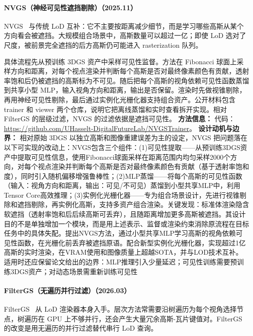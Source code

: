 \paragraph{NVGS（神经可见性遮挡剔除）（2025.11）}
NVGS~\cite{2511_19202} 与传统 LoD 互补：它不主要按距离减少细节，而是学习哪些高斯从某个方向看会被遮挡。大规模组合场景中，高斯数量可以超过一亿；即使 LoD 选对了尺度，被前景完全遮挡的后方高斯仍可能进入 rasterization 队列。

具体流程先从预训练 3DGS 资产中采样可见性监督。方法在 Fibonacci 球面上采样方向和距离，对每个视点渲染并判断每个高斯是否对最终像素颜色有贡献，透射率饱和后仍被遮挡的高斯标为不可见。随后把每个高斯的视角依赖可见性函数蒸馏到共享小型 MLP，输入视角方向和距离，输出是否保留。渲染时先做视锥剔除，再用神经可见性剔除，最后通过实例化光栅化器支持组合资产。公开材料包含 trainer 和 viewer 两个仓库，说明它把离线蒸馏和实时查看拆开实现。相对 FilterGS 的层级过滤，NVGS 的过滤依据是遮挡可见性。
\textbf{方法信息：} 代码：\url{https://github.com/UHasselt-DigitalFutureLab/NVGSTrainer}。
\textbf{设计动机与边界：} 相对原始 3DGS 以独立高斯和图像重建误差为主的设定，NVGS 把问题落在以下可实现的改动上：NVGS包含三个组件：(1)可见性提取——从预训练3DGS资产中提取可见性信息，使用Fibonacci球面采样在距离范围内均匀采样2000个方向，对每个视点渲染并判断每个高斯是否对最终像素颜色有贡献（基于透射率饱和度），同时引入随机偏移增强鲁棒性；(2)MLP蒸馏——将每个高斯的可见性函数（输入：视角方向和距离，输出：可见/不可见）蒸馏到小型共享MLP中，利用Tensor Core高效推理；(3)实例化光栅化器——专为组合场景设计，先进行视锥剔除和遮挡剔除，再实例化高斯，支持多资产组合渲染。关键发现：标准体渲染隐含软遮挡（透射率饱和后后续高斯可丢弃），且随距离增加更多高斯被遮挡。其设计目的不是单独增加一个模块，而是用上述表示、监督或渲染约束消除原流程在目标任务中的具体失配。提出NVGS方法，通过小型共享MLP学习高斯的视角依赖可见性函数，在光栅化前丢弃被遮挡原语。配合新型实例化光栅化器，实现超过1亿高斯的实时渲染，在VRAM使用和图像质量上超越SOTA，并与LOD技术互补。适用时还应保留论文给出的边界：MLP推理引入少量延迟；可见性训练需要预训练3DGS资产；对动态场景需重新训练可见性
\paragraph{FilterGS（无遍历并行过滤）（2026.03）}
FilterGS~\cite{2603_23891} 从 LoD 渲染器本身入手。层次方法常需要沿树遍历为每个视角选择节点，树遍历在 GPU 上不够并行，还会产生大量冗余高斯-瓦片键值对。FilterGS 的改变是用无遍历的并行过滤替代串行 LoD 查询。

